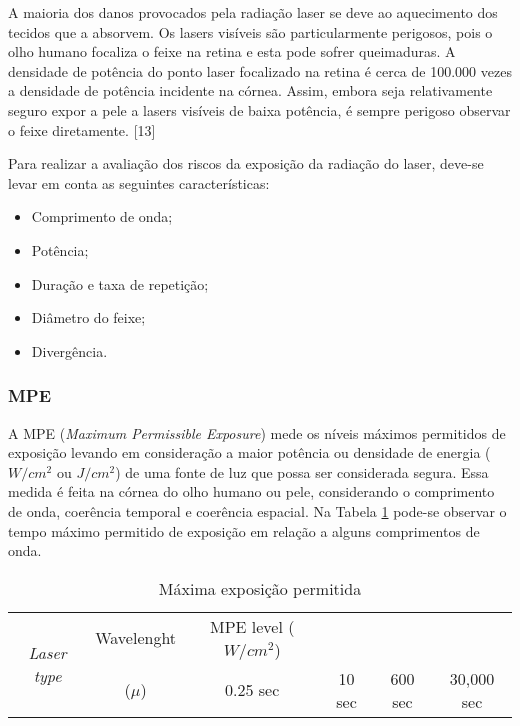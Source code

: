 A maioria dos danos provocados pela radiação laser se deve ao aquecimento dos tecidos que a absorvem. Os lasers visíveis são particularmente perigosos, pois o olho humano focaliza o feixe na retina e esta pode sofrer queimaduras. A densidade de potência do ponto laser focalizado na retina é cerca de 100.000 vezes a densidade de potência incidente na córnea. Assim, embora seja relativamente seguro expor a pele a lasers visíveis de baixa potência, é sempre perigoso observar o feixe diretamente. [13]

Para realizar a avaliação dos riscos da exposição da radiação do laser, deve-se levar em conta as seguintes características:

\begin{itemize}
	\item Comprimento de onda;
	\item Potência;
	\item Duração e taxa de repetição;
	\item Diâmetro do feixe;
	\item Divergência.
\end{itemize}

\subsubsection{MPE}

A MPE (\emph{Maximum Permissible Exposure}) mede os níveis máximos permitidos de exposição levando em consideração a maior potência ou densidade de energia (\mbox{$W/cm^2$} ou \mbox{$J/cm^2$}) de uma fonte de luz que possa ser considerada segura. Essa medida é feita na córnea do olho humano ou pele, considerando o comprimento de onda, coerência temporal e coerência espacial. Na Tabela \ref{tab:mpe} pode-se observar o tempo máximo permitido de exposição em relação a alguns comprimentos de onda.

\begin{table}[ht!]
	\caption{Máxima exposição permitida}
	\label{tab:mpe}
	\begin{tabular}{c|c|c|c|c|c}
		\hline
		\multirow{2}{*}{\emph{Laser type}} & Wavelenght & MPE level (\mbox{$W/cm^2$})\\
		\cline{2-6}
		& (\mbox{$\mu$}) & 0.25 sec & 10 sec & 600 sec & 30,000 sec\\
		\hline
		
	\end{tabular}
\end{table}